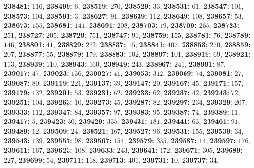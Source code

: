 \textsf{\bfseries 238481:} $116$, \textsf{\bfseries 238499:} $6$, \textsf{\bfseries 238519:} $270$, \textsf{\bfseries 238529:} $33$, \textsf{\bfseries 238531:} $61$, \textsf{\bfseries 238547:} $101$, \textsf{\bfseries 238573:} $104$, \textsf{\bfseries 238591:} $3$, \textsf{\bfseries 238627:} $91$, \textsf{\bfseries 238639:} $112$, \textsf{\bfseries 238649:} $108$, \textsf{\bfseries 238657:} $53$, \textsf{\bfseries 238673:} $155$, \textsf{\bfseries 238681:} $141$, \textsf{\bfseries 238691:} $208$, \textsf{\bfseries 238703:} $19$, \textsf{\bfseries 238709:} $265$, \textsf{\bfseries 238723:} $251$, \textsf{\bfseries 238727:} $205$, \textsf{\bfseries 238729:} $751$, \textsf{\bfseries 238747:} $91$, \textsf{\bfseries 238759:} $155$, \textsf{\bfseries 238781:} $76$, \textsf{\bfseries 238789:} $146$, \textsf{\bfseries 238801:} $41$, \textsf{\bfseries 238829:} $252$, \textsf{\bfseries 238837:} $15$, \textsf{\bfseries 238841:} $407$, \textsf{\bfseries 238853:} $270$, \textsf{\bfseries 238859:} $207$, \textsf{\bfseries 238877:} $55$, \textsf{\bfseries 238879:} $179$, \textsf{\bfseries 238883:} $102$, \textsf{\bfseries 238897:} $101$, \textsf{\bfseries 238919:} $69$, \textsf{\bfseries 238921:} $113$, \textsf{\bfseries 238939:} $110$, \textsf{\bfseries 238943:} $160$, \textsf{\bfseries 238949:} $243$, \textsf{\bfseries 238967:} $241$, \textsf{\bfseries 238991:} $87$, \textsf{\bfseries 239017:} $47$, \textsf{\bfseries 239023:} $136$, \textsf{\bfseries 239027:} $41$, \textsf{\bfseries 239053:} $312$, \textsf{\bfseries 239069:} $74$, \textsf{\bfseries 239081:} $27$, \textsf{\bfseries 239087:} $80$, \textsf{\bfseries 239119:} $221$, \textsf{\bfseries 239137:} $39$, \textsf{\bfseries 239147:} $20$, \textsf{\bfseries 239167:} $45$, \textsf{\bfseries 239171:} $157$, \textsf{\bfseries 239179:} $132$, \textsf{\bfseries 239201:} $53$, \textsf{\bfseries 239231:} $62$, \textsf{\bfseries 239233:} $62$, \textsf{\bfseries 239237:} $42$, \textsf{\bfseries 239243:} $72$, \textsf{\bfseries 239251:} $104$, \textsf{\bfseries 239263:} $10$, \textsf{\bfseries 239273:} $45$, \textsf{\bfseries 239287:} $82$, \textsf{\bfseries 239297:} $234$, \textsf{\bfseries 239329:} $207$, \textsf{\bfseries 239333:} $112$, \textsf{\bfseries 239347:} $84$, \textsf{\bfseries 239357:} $97$, \textsf{\bfseries 239383:} $95$, \textsf{\bfseries 239387:} $74$, \textsf{\bfseries 239389:} $11$, \textsf{\bfseries 239417:} $5$, \textsf{\bfseries 239423:} $30$, \textsf{\bfseries 239429:} $335$, \textsf{\bfseries 239431:} $181$, \textsf{\bfseries 239441:} $63$, \textsf{\bfseries 239461:} $91$, \textsf{\bfseries 239489:} $12$, \textsf{\bfseries 239509:} $24$, \textsf{\bfseries 239521:} $167$, \textsf{\bfseries 239527:} $96$, \textsf{\bfseries 239531:} $155$, \textsf{\bfseries 239539:} $34$, \textsf{\bfseries 239543:} $139$, \textsf{\bfseries 239557:} $98$, \textsf{\bfseries 239567:} $154$, \textsf{\bfseries 239579:} $335$, \textsf{\bfseries 239587:} $14$, \textsf{\bfseries 239597:} $176$, \textsf{\bfseries 239611:} $167$, \textsf{\bfseries 239623:} $108$, \textsf{\bfseries 239633:} $243$, \textsf{\bfseries 239641:} $172$, \textsf{\bfseries 239671:} $305$, \textsf{\bfseries 239689:} $227$, \textsf{\bfseries 239699:} $54$, \textsf{\bfseries 239711:} $118$, \textsf{\bfseries 239713:} $401$, \textsf{\bfseries 239731:} $10$, \textsf{\bfseries 239737:} $34$, 
